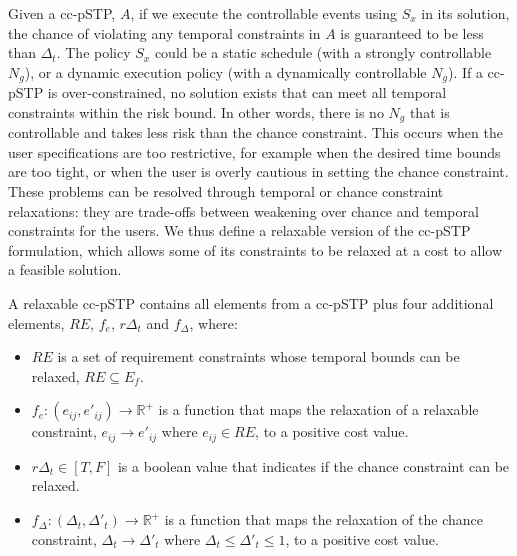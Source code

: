 \documentclass[jair,twoside,11pt,theapa]{article}
\begin{document}
Given a cc-pSTP, $A$, if we execute the
controllable events using $S_x$ in its solution, the chance of violating any
temporal constraints in $A$ is guaranteed to be less than $\Delta_t$. The policy
$S_x$ could be a static schedule (with a strongly controllable $N_g$), or a
dynamic execution policy (with a dynamically controllable $N_g$). If a cc-pSTP
is over-constrained, no solution exists that can meet all temporal constraints
within the risk bound. In other words, there is no $N_g$ that is
controllable and takes less risk than the chance constraint. This occurs when
the user specifications are too restrictive, for example when the desired time
bounds are too tight, or when the user is overly cautious in setting the chance
constraint. These problems can be resolved through temporal or chance constraint
relaxations: they are trade-offs between
weakening over chance and temporal constraints for the users. We
thus define a relaxable version of the cc-pSTP formulation, which allows some of
its constraints to be relaxed at a cost to allow a feasible solution. 

\begin{mydef}
	
	A relaxable cc-pSTP contains all elements from a cc-pSTP plus four additional
	elements, $RE$, $f_e$, $r\Delta_t$ and $f_\Delta$, where: 
	
	\begin{itemize}
		
		\item $RE$ is a set of requirement constraints whose temporal bounds can be
		relaxed, $RE\subseteq E_f$.
		
		\item $f_{e}:(e_{ij},e'_{ij})\rightarrow \mathbb{R}^+$ is a function that
		maps the relaxation of a relaxable constraint, $e_{ij}\rightarrow e'_{ij}$
		where
		$e_{ij}\in RE$, to a positive cost value. 
		
		\item $r\Delta_t\in [T,F]$ is a boolean value that indicates if the chance
		constraint can be relaxed.
		
		\item $f_\Delta:(\Delta_t,\Delta'_t)\rightarrow \mathbb{R}^+$ is a function
		that maps the relaxation of the chance constraint, $\Delta_t\rightarrow
		\Delta'_t$ where $\Delta_t\leq \Delta'_t\leq 1$, to a positive cost value.
		
	\end{itemize}
	
\end{mydef}
\end{document}
